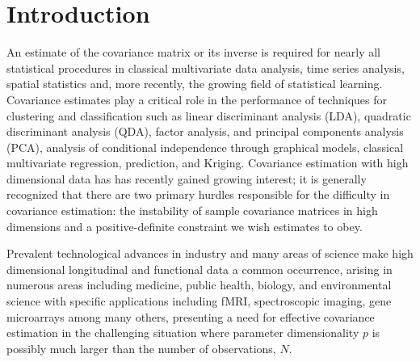 

\chapter{Introduction}

\indent

An estimate of the covariance matrix or its inverse is required for nearly all statistical procedures in classical multivariate data analysis, time series analysis, spatial statistics and, more recently, the growing field of statistical learning. Covariance estimates play a critical role in the performance of techniques for clustering and classification such as linear discriminant analysis (LDA), quadratic discriminant analysis (QDA), factor analysis, and principal components analysis (PCA), analysis of conditional independence through graphical models, classical multivariate regression, prediction, and Kriging. Covariance estimation with high dimensional data has has recently gained growing interest; it is generally recognized that there are two primary hurdles responsible for the difficulty in covariance estimation: the instability of sample covariance matrices in high dimensions and a positive-definite constraint we wish estimates to obey.

\bigskip

Prevalent technological advances in industry and many areas of science make high dimensional longitudinal and functional data a common occurrence, arising in numerous areas including medicine, public health, biology, and environmental science with specific applications including fMRI, spectroscopic imaging, gene microarrays among many others, presenting a need for effective covariance estimation in the challenging situation where parameter dimensionality $p$ is possibly much larger than the number of observations, $N$. 

\bigskip

